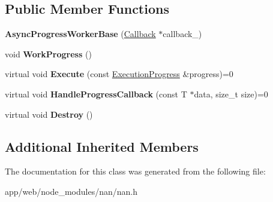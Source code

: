 \subsection*{Public Member Functions}
\begin{DoxyCompactItemize}
\item 
\mbox{\label{class_nan_1_1_async_progress_worker_base_af778f797e47d2622a0def89ac6da9fc3}} 
{\bfseries Async\+Progress\+Worker\+Base} (\hyperlink{class_nan_1_1_callback}{Callback} $\ast$callback\+\_\+)
\item 
\mbox{\label{class_nan_1_1_async_progress_worker_base_ad1becfe1be67d75744b89358dd7edd82}} 
void {\bfseries Work\+Progress} ()
\item 
\mbox{\label{class_nan_1_1_async_progress_worker_base_ab839544217af341e18452437fa9f5ce0}} 
virtual void {\bfseries Execute} (const \hyperlink{class_nan_1_1_async_progress_worker_base_1_1_execution_progress}{Execution\+Progress} \&progress)=0
\item 
\mbox{\label{class_nan_1_1_async_progress_worker_base_a8a42a88668657a511f44fc97fcf06d85}} 
virtual void {\bfseries Handle\+Progress\+Callback} (const T $\ast$data, size\+\_\+t size)=0
\item 
\mbox{\label{class_nan_1_1_async_progress_worker_base_abc597459fa339d31f540ac1867e9d06e}} 
virtual void {\bfseries Destroy} ()
\end{DoxyCompactItemize}
\subsection*{Additional Inherited Members}


The documentation for this class was generated from the following file\+:\begin{DoxyCompactItemize}
\item 
app/web/node\+\_\+modules/nan/nan.\+h\end{DoxyCompactItemize}
